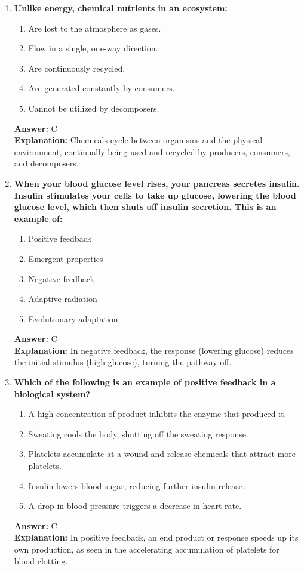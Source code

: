 \documentclass[11pt, a4paper]{article}
\begin{document}
\begin{enumerate}
\item \textbf{Unlike energy, chemical nutrients in an ecosystem:}
\begin{enumerate}[label=\Alph*.]
    \item Are lost to the atmosphere as gases.
    \item Flow in a single, one-way direction.
    \item Are continuously recycled.
    \item Are generated constantly by consumers.
    \item Cannot be utilized by decomposers.
\end{enumerate}
\textbf{Answer:} C \\
\textbf{Explanation:} Chemicals cycle between organisms and the physical environment, continually being used and recycled by producers, consumers, and decomposers.

\item \textbf{When your blood glucose level rises, your pancreas secretes insulin. Insulin stimulates your cells to take up glucose, lowering the blood glucose level, which then shuts off insulin secretion. This is an example of:}
\begin{enumerate}[label=\Alph*.]
    \item Positive feedback
    \item Emergent properties
    \item Negative feedback
    \item Adaptive radiation
    \item Evolutionary adaptation
\end{enumerate}
\textbf{Answer:} C \\
\textbf{Explanation:} In negative feedback, the response (lowering glucose) reduces the initial stimulus (high glucose), turning the pathway off.

\item \textbf{Which of the following is an example of positive feedback in a biological system?}
\begin{enumerate}[label=\Alph*.]
    \item A high concentration of product inhibits the enzyme that produced it.
    \item Sweating cools the body, shutting off the sweating response.
    \item Platelets accumulate at a wound and release chemicals that attract more platelets.
    \item Insulin lowers blood sugar, reducing further insulin release.
    \item A drop in blood pressure triggers a decrease in heart rate.
\end{enumerate}
\textbf{Answer:} C \\
\textbf{Explanation:} In positive feedback, an end product or response speeds up its own production, as seen in the accelerating accumulation of platelets for blood clotting.


\end{enumerate}
\end{document}
